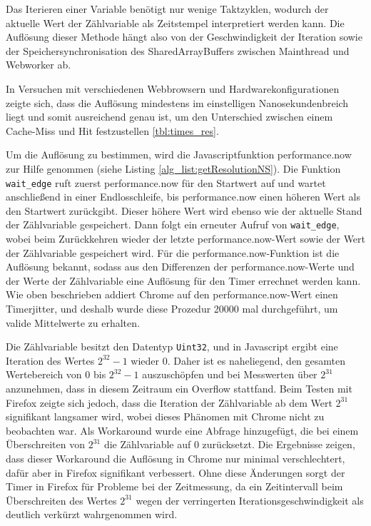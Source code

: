 Das Iterieren einer Variable benötigt nur wenige Taktzyklen, wodurch der aktuelle Wert der Zählvariable als Zeitstempel interpretiert werden kann. 
Die Auflösung dieser Methode hängt also von der Geschwindigkeit der Iteration sowie der Speichersynchronisation des SharedArrayBuffers zwischen Mainthread und Webworker ab.

In Versuchen mit verschiedenen Webbrowsern und Hardwarekonfigurationen zeigte sich, dass die Auflösung mindestens im einstelligen Nanosekundenbreich liegt und somit ausreichend genau ist, um den Unterschied zwischen einem Cache-Miss und Hit festzustellen \ref{tbl:times_res}.

Um die Auflösung zu bestimmen, wird die Javascriptfunktion performance.now zur Hilfe genommen (siehe Listing \ref{alg_list:getResolutionNS}). Die Funktion \lstinline{wait_edge} ruft zuerst performance.now für den Startwert auf und wartet anschließend in einer Endlosschleife, bis performance.now einen höheren Wert als den Startwert zurückgibt. 
Dieser höhere Wert wird ebenso wie der aktuelle Stand der Zählvariable gespeichert. 
Dann folgt ein erneuter Aufruf von \lstinline{wait_edge}, wobei beim Zurückkehren wieder der letzte performance.now-Wert sowie der Wert der Zählvariable gespeichert wird.
Für die performance.now-Funktion ist die Auflösung bekannt, sodass aus den Differenzen der performance.now-Werte und der Werte der Zählvariable eine Auflösung für den Timer errechnet werden kann.
Wie oben beschrieben addiert Chrome auf den performance.now-Wert einen Timerjitter, und deshalb wurde diese Prozedur 20000 mal durchgeführt, um valide Mittelwerte zu erhalten.

Die Zählvariable besitzt den Datentyp \lstinline{Uint32}, und in Javascript ergibt eine Iteration des Wertes $2^{32}-1$ wieder 0. 
Daher ist es naheliegend, den gesamten Wertebereich von 0 bis $2^{32}-1$ auszuschöpfen und bei Messwerten über $2^{31}$ anzunehmen, dass in diesem Zeitraum ein Overflow stattfand.
Beim Testen mit Firefox zeigte sich jedoch, dass die Iteration der Zählvariable ab dem Wert $2^{31}$ signifikant langsamer wird, wobei dieses Phänomen mit Chrome nicht zu beobachten war.
Als Workaround wurde eine Abfrage hinzugefügt, die bei einem Überschreiten von $2^{31}$ die Zählvariable auf 0 zurücksetzt.
Die Ergebnisse zeigen, dass dieser Workaround die Auflösung in Chrome nur minimal verschlechtert, dafür aber in Firefox signifikant verbessert.
Ohne diese Änderungen sorgt der Timer in Firefox für Probleme bei der Zeitmessung, da ein Zeitintervall beim Überschreiten des Wertes $2^{31}$ wegen der verringerten Iterationsgeschwindigkeit als deutlich verkürzt wahrgenommen wird.

